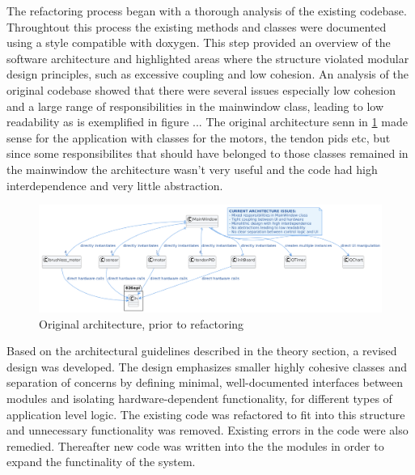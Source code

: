 The refactoring process began with a thorough analysis of the existing codebase. Throughtout this process the existing methods and classes were documented using a style compatible with doxygen. This step provided an overview of the software architecture and highlighted areas where the structure violated modular design principles, such as excessive coupling and low cohesion.
\newline \newline
An analysis of the original codebase showed that there were several issues especially low cohesion and a large range of responsibilities in the mainwindow class, leading to low readability as is exemplified in figure ...
\newline \newline
The original architecture senn in \ref{fig:oldarchitecture} made sense for the application with classes for the motors, the tendon pids etc, but since some responsibilites that should have belonged to those classes remained in the mainwindow the architecture wasn't very useful and the code had high interdependence and very little abstraction.
\begin{figure}
    \centering
    \includegraphics[width=1.15\linewidth]{images/Software documentation/old code/architecture2.png}
    \caption{Original architecture, prior to refactoring}
    \label{fig:oldarchitecture}
\end{figure}
Based on the architectural guidelines described in the theory section, a revised design was developed. The design emphasizes smaller highly cohesive classes and separation of concerns by defining minimal, well-documented interfaces between modules and isolating hardware-dependent functionality, for different types of application level logic. The existing code was refactored to fit into this structure and unnecessary functionality was removed. Existing errors in the code were also remedied. Thereafter new code was written into the the modules in order to expand the functinality of the system.


